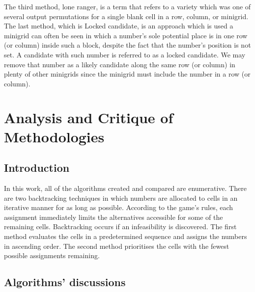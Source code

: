 \documentclass[12pt]{extarticle}
\theoremstyle{plain}
\begin{document}
The third method, lone ranger, is a term that refers to a variety which was one of several output permutations for a single blank cell in a row, column, or minigrid. The last method, which is Locked candidate, is an approach which is used a minigrid can often be seen in which a number's sole potential place is in one row (or column) inside such a block, despite the fact that the number's position is not set. A candidate with such number is referred to as a locked candidate. We may remove that number as a likely candidate along the same row (or column) in plenty of other minigrids since the minigrid must include the number in a row (or column).


\section*{Analysis and Critique of Methodologies}
\subsection*{Introduction}
In this work, all of the algorithms created and compared are enumerative.
There are two backtracking techniques in which numbers are allocated to cells in an iterative manner for as long as possible. According to the game's rules, each assignment immediately limits the alternatives accessible for some of the remaining cells. Backtracking occurs if an infeasibility is discovered.
The first method evaluates the cells in a predetermined sequence and assigns the numbers in ascending order. The second method prioritises the cells with the fewest possible assignments remaining.
\subsection*{Algorithms' discussions}
\end{document}
